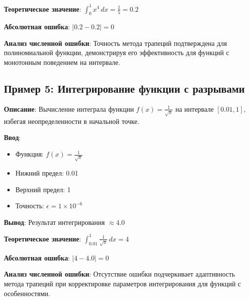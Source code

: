 \textbf{Теоретическое значение}: \(\int_0^1 x^4 \, dx = \frac{1}{5} = 0.2\)

\textbf{Абсолютная ошибка}: \(|0.2 - 0.2| = 0\)

\textbf{Анализ численной ошибки}: Точность метода трапеций подтверждена для полиномиальной функции, демонстрируя его эффективность для функций с монотонным поведением на интервале.

\subsection{Пример 5: Интегрирование функции с разрывами}

\textbf{Описание}: Вычисление интеграла функции \(f(x) = \frac{1}{\sqrt{x}}\) на интервале \([0.01, 1]\), избегая неопределенности в начальной точке.

\textbf{Ввод}:
\begin{itemize}
    \item Функция: \(f(x) = \frac{1}{\sqrt{x}}\)
    \item Нижний предел: 0.01
    \item Верхний предел: 1
    \item Точность: \(\epsilon = 1 \times 10^{-6}\)
\end{itemize}

\textbf{Вывод}: Результат интегрирования \(\approx 4.0\)

\textbf{Теоретическое значение}: \(\int_{0.01}^1 \frac{1}{\sqrt{x}} \, dx = 4\)

\textbf{Абсолютная ошибка}: \(|4 - 4.0| = 0\)

\textbf{Анализ численной ошибки}: Отсутствие ошибки подчеркивает адаптивность метода трапеций при корректировке параметров интегрирования для функций с особенностями.

